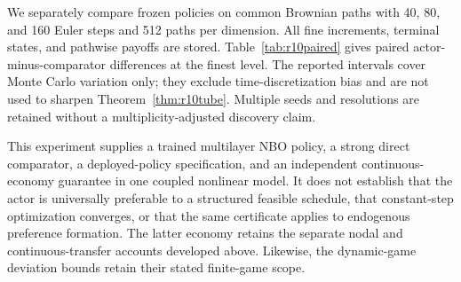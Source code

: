 We separately compare frozen policies on common Brownian paths with 40, 80, and 160 Euler steps and 512 paths per dimension. All fine increments, terminal states, and pathwise payoffs are stored. Table~\ref{tab:r10paired} gives paired actor-minus-comparator differences at the finest level. The reported intervals cover Monte Carlo variation only; they exclude time-discretization bias and are not used to sharpen Theorem~\ref{thm:r10tube}. Multiple seeds and resolutions are retained without a multiplicity-adjusted discovery claim.


This experiment supplies a trained multilayer NBO policy, a strong direct comparator, a deployed-policy specification, and an independent continuous-economy guarantee in one coupled nonlinear model. It does not establish that the actor is universally preferable to a structured feasible schedule, that constant-step optimization converges, or that the same certificate applies to endogenous preference formation. The latter economy retains the separate nodal and continuous-transfer accounts developed above. Likewise, the dynamic-game deviation bounds retain their stated finite-game scope.
